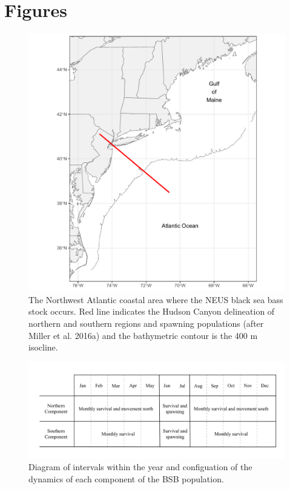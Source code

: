 \documentclass[
]{article}
\begin{document}
\hypertarget{figures}{%
\section*{Figures}\label{figures}}



\begin{figure}

{\centering \includegraphics[width=1\linewidth]{map} 

}

\caption{The Northwest Atlantic coastal area where the NEUS black sea bass stock occurs. Red line indicates the Hudson Canyon delineation of northern and southern regions and spawning populations (after Miller et al. 2016a) and the bathymetric contour is the 400 m isocline.}\label{fig:map}
\end{figure}
\pagebreak

\begin{figure}

{\centering \includegraphics[width=0.8\linewidth]{bsb_movement_diagram} 

}

\caption{Diagram of intervals within the year and configuation of the dynamics of each component of the BSB population.}\label{fig:migration-diagram}
\end{figure}
\pagebreak
\end{document}
